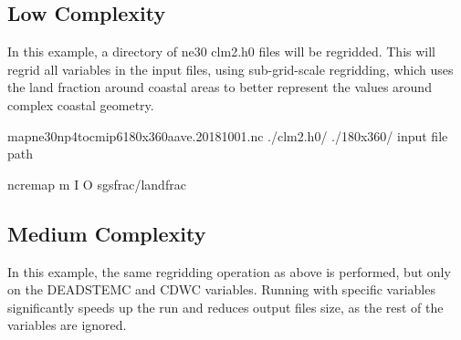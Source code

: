 \documentclass[letterpaper,10pt,english]{sphinxmanual}
\begin{document}
\subsection{Low Complexity}
\label{\detokenize{lnd_regrid:low-complexity}}
In this example, a directory of ne30 clm2.h0 files will be regridded. This will regrid all variables in the input files, using sub-grid-scale
regridding, which uses the land fraction around coastal areas to better represent the values around complex coastal geometry.

\begin{sphinxVerbatim}[commandchars=\\\{\}]
map\PYGZus{}ne30np4\PYGZus{}to\PYGZus{}cmip6\PYGZus{}180x360\PYGZus{}aave.20181001.nc
./clm2.h0/
./180x360/
\PYGZlt{}input file path\PYGZgt{} 

ncremap \PYGZhy{}m  \PYGZhy{}I  \PYGZhy{}O  \PYGZhy{}\PYGZhy{}sgs\PYGZus{}frac/landfrac
\end{sphinxVerbatim}


\subsection{Medium Complexity}
\label{\detokenize{lnd_regrid:medium-complexity}}
In this example, the same regridding operation as above is performed, but only on the DEADSTEMC and CDWC variables.
Running with specific variables significantly speeds up the run and reduces output files size, as the rest of the variables are ignored.
\end{document}
